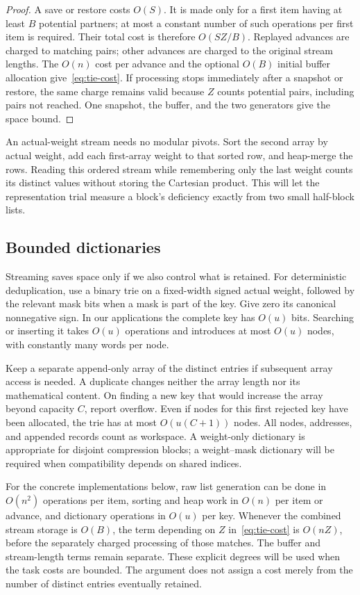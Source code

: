 \begin{proof}
A save or restore costs $O(S)$. It is made only for a first item
having at least $B$ potential partners; at most a constant number of
such operations per first item is required. Their total cost is
therefore $O(SZ/B)$. Replayed advances are charged to matching pairs;
other advances are charged to the original stream lengths. The
$O(n)$ cost per advance and the optional $O(B)$ initial buffer
allocation give~\eqref{eq:tie-cost}. If processing stops immediately
after a snapshot or restore, the same charge remains valid because
$Z$ counts potential pairs, including pairs not reached. One snapshot,
the buffer, and the two generators give the space bound.
\end{proof}

An actual-weight stream needs no modular pivots. Sort the second array
by actual weight, add each first-array weight to that sorted row, and
heap-merge the rows. Reading this ordered stream while remembering
only the last weight counts its distinct values without storing the
Cartesian product. This will let the representation trial measure a
block's deficiency exactly from two small half-block lists.

\subsection{Bounded dictionaries}

Streaming saves space only if we also control what is retained.
For deterministic deduplication, use a binary trie on a fixed-width
signed actual weight, followed by the relevant mask bits when a mask
is part of the key. Give zero its canonical nonnegative sign. In our
applications the complete key has $O(u)$ bits. Searching or inserting
it takes $O(u)$ operations and introduces at most $O(u)$ nodes,
with constantly many words per node.

Keep a separate append-only array of the distinct entries if subsequent
array access is needed. A duplicate changes neither the array length
nor its mathematical content. On finding a new key that would increase
the array beyond capacity $C$, report overflow. Even if nodes for this
first rejected key have been allocated, the trie has at most
$O(u(C+1))$ nodes. All nodes, addresses, and appended records count as
workspace. A weight-only dictionary is appropriate for disjoint
compression blocks; a weight--mask dictionary will be required when
compatibility depends on shared indices.

For the concrete implementations below, raw list generation can be
done in $O(n^2)$ operations per item, sorting and heap work in $O(n)$
per item or advance, and dictionary operations in $O(u)$ per key.
Whenever the combined stream storage is $O(B)$, the term depending
on $Z$ in~\eqref{eq:tie-cost} is $O(nZ)$, before the separately
charged processing of those matches. The buffer and stream-length
terms remain separate. These explicit
degrees will be used when the task costs are bounded. The argument
does not assign a cost merely from the number of distinct entries
eventually retained.
